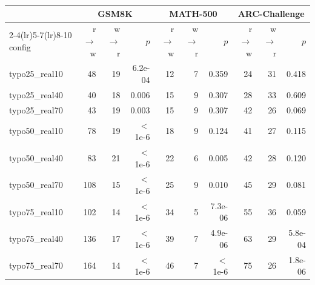 \begin{tabular}{l rrr rrr rrr}
\toprule
 & \multicolumn{3}{c}{GSM8K} & \multicolumn{3}{c}{MATH-500} & \multicolumn{3}{c}{ARC-Challenge} \\
\cmidrule(lr){2-4}\cmidrule(lr){5-7}\cmidrule(lr){8-10}
config & r$\to$w & w$\to$r & $p$ & r$\to$w & w$\to$r & $p$ & r$\to$w & w$\to$r & $p$ \\
\midrule
typo25\_real10 & 48 & 19 & 6.2e-04 & 12 & 7 & 0.359 & 24 & 31 & 0.418 \\
typo25\_real40 & 40 & 18 & 0.006 & 15 & 9 & 0.307 & 28 & 33 & 0.609 \\
typo25\_real70 & 43 & 19 & 0.003 & 15 & 9 & 0.307 & 42 & 26 & 0.069 \\
typo50\_real10 & 78 & 19 & $<$1e-6 & 18 & 9 & 0.124 & 41 & 27 & 0.115 \\
typo50\_real40 & 83 & 21 & $<$1e-6 & 22 & 6 & 0.005 & 42 & 28 & 0.120 \\
typo50\_real70 & 108 & 15 & $<$1e-6 & 25 & 9 & 0.010 & 45 & 29 & 0.081 \\
typo75\_real10 & 102 & 14 & $<$1e-6 & 34 & 5 & 7.3e-06 & 55 & 36 & 0.059 \\
typo75\_real40 & 136 & 17 & $<$1e-6 & 39 & 7 & 4.9e-06 & 63 & 29 & 5.8e-04 \\
typo75\_real70 & 164 & 14 & $<$1e-6 & 46 & 7 & $<$1e-6 & 75 & 26 & 1.8e-06 \\
\bottomrule
\end{tabular}
